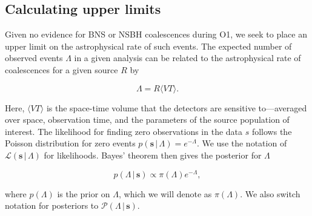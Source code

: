 \subsection{Calculating upper limits}
\label{ssec:upper_limits}

Given no evidence for \ac{BNS} or \ac{NSBH} coalescences during \ac{O1}, we seek to place an upper limit
on the astrophysical rate of such events.
The expected number of observed events $\Lambda$ in a given analysis can be
related to the astrophysical rate of coalescences for a given source $R$ by
%
\begin{linenomath*}
\begin{equation}
    \Lambda = R { \langle VT \rangle}.
\end{equation}
\end{linenomath*}
%
Here, $\langle VT \rangle$ is the space-time volume that the detectors are sensitive
to---averaged over space, observation time, and the parameters of the source population
of interest. The likelihood for finding zero observations in the data $s$ follows the
Poisson distribution for zero events $p (\mathbf{s} \, | \, \Lambda) = e^{-\Lambda}$. We use
the notation of $\mathcal{L} (\mathbf{s} \, | \, \Lambda)$ for likelihoods. Bayes' theorem then
gives the posterior for $\Lambda$
%
\begin{linenomath*}
\begin{equation}
    p (\Lambda \, | \, \mathbf{s} ) \propto \pi (\Lambda) e^{-\Lambda},
\label{eq:lambdapost}
\end{equation}
\end{linenomath*}
%
where $p(\Lambda)$ is the prior on $\Lambda$, which we will denote as $\pi(\Lambda)$.
We also switch notation for posteriors to $\mathcal{P}(\Lambda \, | \, \mathbf{s})$.

